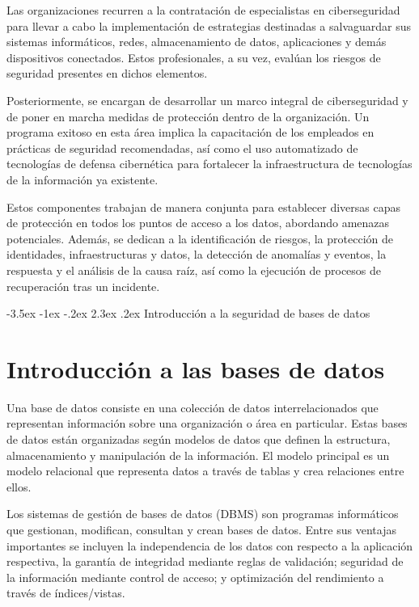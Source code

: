\documentclass[11pt]{report}
\makeatletter
\renewcommand\chapter{\@startsection{chapter}{0}{\z@}%
    {-3.5ex \@plus -1ex \@minus -.2ex}%
    {2.3ex \@plus.2ex}%
    {\normalfont\Large\bfseries}}
\makeatother
\begin{document}
Las organizaciones recurren a la contratación de especialistas en ciberseguridad para llevar a cabo la implementación de estrategias destinadas a salvaguardar sus sistemas informáticos, redes, almacenamiento de datos, aplicaciones y demás dispositivos conectados. Estos profesionales, a su vez, evalúan los riesgos de seguridad presentes en dichos elementos.

Posteriormente, se encargan de desarrollar un marco integral de ciberseguridad y de poner en marcha medidas de protección dentro de la organización. Un programa exitoso en esta área implica la capacitación de los empleados en prácticas de seguridad recomendadas, así como el uso automatizado de tecnologías de defensa cibernética para fortalecer la infraestructura de tecnologías de la información ya existente.

Estos componentes trabajan de manera conjunta para establecer diversas capas de protección en todos los puntos de acceso a los datos, abordando amenazas potenciales. Además, se dedican a la identificación de riesgos, la protección de identidades, infraestructuras y datos, la detección de anomalías y eventos, la respuesta y el análisis de la causa raíz, así como la ejecución de procesos de recuperación tras un incidente.




\cleardoublepage

\chapter{Introducción a la seguridad de bases de datos}
\section{Introducción a las bases de datos}
Una base de datos consiste en una colección de datos interrelacionados que representan
información sobre una organización o área en particular. Estas bases de datos están
organizadas según modelos de datos que definen la estructura, almacenamiento y
manipulación de la información. El modelo principal es un modelo relacional que representa
datos a través de tablas y crea relaciones entre ellos.

Los sistemas de gestión de bases de datos (DBMS) son programas informáticos que
gestionan, modifican, consultan y crean bases de datos. Entre sus ventajas importantes se
incluyen la independencia de los datos con respecto a la aplicación respectiva, la garantía
de integridad mediante reglas de validación; seguridad de la información mediante control
de acceso; y optimización del rendimiento a través de índices/vistas.
\end{document}
